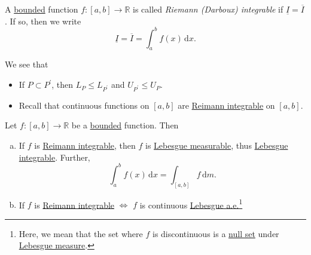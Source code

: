 \begin{definition}\label{def:Riemann-integrable}
	A \underline{bounded} function \(f\colon [a, b]\to \mathbb{R} \) is called \emph{Riemann (Darboux) integrable}
	if \(\underline{I} = \overline{I}\). If so, then we write
	\[
		\underline{I} = \overline{I} = \int_{a}^{b} f(x) \,\mathrm{d}x.
	\]
\end{definition}
\begin{note}
	We see that
	\begin{itemize}
		\item If \(P\subset P ^\prime \), then \(L_{P}\leq L_{P ^\prime }\) and \(U_{P ^\prime }\leq U_{P}\).
		\item Recall that continuous functions on \([a, b]\) are \hyperref[def:Riemann-integrable]{Reimann integrable} on \([a, b]\).
	\end{itemize}
\end{note}
\begin{theorem}
	Let \(f\colon [a, b]\to \mathbb{R} \) be a \underline{bounded} function. Then
	\begin{enumerate}[(a)]
		\item If \(f\) is \hyperref[def:Riemann-integrable]{Reimann integrable}, then \(f\) is \hyperref[def:measurable-function]{Lebesgue measurable}, thus
		      \hyperref[def:integrable]{Lebesgue integrable}. Further,
		      \[
			      \int_{a}^{b} f(x) \,\mathrm{d}x = \int_{[a, b]}f \,\mathrm{d}m.
		      \]
		\item If \(f\) is \hyperref[def:Riemann-integrable]{Reimann integrable} \(\iff \) \(f\) is continuous \underline{\hyperref[def:Lebesgue-measure]{Lebesgue} \hyperref[def:mu-almost-everywhere]{a.e.}}\footnote{Here, we
			      mean that the set where \(f\) is discontinuous is a \hyperref[def:mu-null-set]{null set} under \hyperref[def:Lebesgue-measure]{Lebesgue measure}.}
	\end{enumerate}
\end{theorem}
